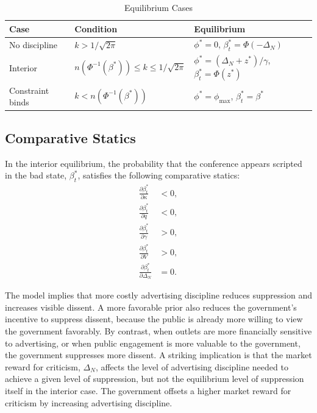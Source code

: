 \begin{table}[htbp]
\centering
\caption{Equilibrium Cases}
\label{tab:equilibrium_cases}
\begin{tabular}{lll}
\toprule
Case & Condition & Equilibrium \\
\midrule
No discipline & $k>1/\sqrt{2\pi}$ & $\phi^*=0$, $\beta_t^*=\Phi(-\Delta_N)$ \\
Interior & $n(\Phi^{-1}(\beta^*))\leq k\leq 1/\sqrt{2\pi}$ & $\phi^*=(\Delta_N+z^*)/\gamma$, $\beta_t^*=\Phi(z^*)$ \\
Constraint binds & $k<n(\Phi^{-1}(\beta^*))$ & $\phi^*=\phi_{\max}$, $\beta_t^*=\beta^*$ \\
\bottomrule
\end{tabular}
\end{table}

\subsection{Comparative Statics}

\begin{proposition}
In the interior equilibrium, the probability that the conference appears scripted in the bad state, $\beta_t^*$, satisfies the following comparative statics:
\begin{align}
    \frac{\partial \beta_t^*}{\partial \kappa} &<0, \\
    \frac{\partial \beta_t^*}{\partial q} &<0, \\
    \frac{\partial \beta_t^*}{\partial \gamma} &>0, \\
    \frac{\partial \beta_t^*}{\partial V} &>0, \\
    \frac{\partial \beta_t^*}{\partial \Delta_N} &=0.
\end{align}
\end{proposition}

The model implies that more costly advertising discipline reduces suppression and increases visible dissent. A more favorable prior also reduces the government's incentive to suppress dissent, because the public is already more willing to view the government favorably. By contrast, when outlets are more financially sensitive to advertising, or when public engagement is more valuable to the government, the government suppresses more dissent. A striking implication is that the market reward for criticism, $\Delta_N$, affects the level of advertising discipline needed to achieve a given level of suppression, but not the equilibrium level of suppression itself in the interior case. The government offsets a higher market reward for criticism by increasing advertising discipline.

\newpage




